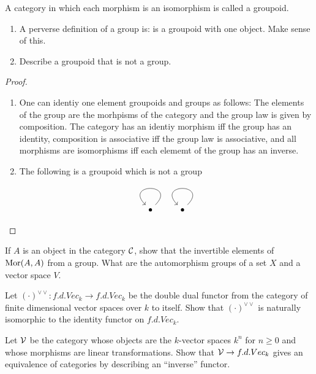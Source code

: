 
\begin{exercise}
    A category in which each morphism is an isomorphism is called a groupoid. 
    \begin{enumerate}[label = (\alph*)]
        \item A perverse definition of a group is: is a groupoid with one object. Make sense of this. 
        \item Describe a groupoid that is not a group. 
    \end{enumerate}
\end{exercise}

\begin{proof} \mbox{}
    \begin{enumerate}[label = (\alph*)]
        \item One can identiy one element groupoids and groups as follows: The elements of the group are the morhpisms of the category and the group law is given by composition. The category has an identiy morphism iff the group has an identity, composition is associative iff the group law is associative, and all morphisms are isomorphisms iff each elememt of the group has an inverse.
        \item The following is a groupoid which is not a group 
        \[ \begin{tikzcd}
            \bullet \arrow[loop] & \bullet \arrow[loop]
        \end{tikzcd} \]
    \end{enumerate}
\end{proof}

\begin{exercise}
    If $A$ is an object in the category $\mathcal{C}$, show that the invertible elements of $\text{Mor}(A, A)$ from a group. What are the automorphism groups of a set $X$ and a vector space $V$. 
\end{exercise}

\begin{exercise}
    Let $(\cdot)^{\vee \vee}: f.d.Vec_k \to f.d.Vec_k$ be the double dual functor from the category of finite dimensional vector spaces over $k$ to itself. Show that $(\cdot)^{\vee \vee}$ is naturally isomorphic to the identity functor on $f.d.Vec_k$. 
\end{exercise}

\begin{exercise}
    Let $\mathcal{V}$ be the category whose objects are the $k$-vector spaces $k^n$ for $n \ge 0$ and whose morphisms are linear transformations. Show that $\mathcal{V} \to f.d.Vec_k$ gives an equivalence of categories by describing an ``inverse'' functor.
\end{exercise}